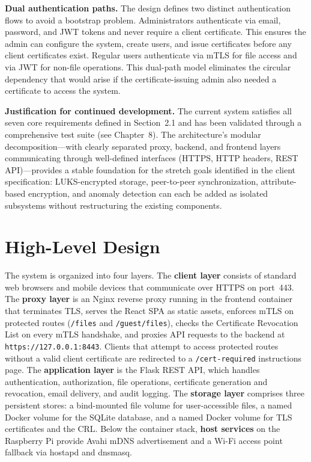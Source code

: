 \documentclass[12pt,letterpaper]{report}
\begin{document}
\textbf{Dual authentication paths.} The design defines two distinct authentication flows to avoid a bootstrap problem. Administrators authenticate via email, password, and JWT tokens and never require a client certificate. This ensures the admin can configure the system, create users, and issue certificates before any client certificates exist. Regular users authenticate via mTLS for file access and via JWT for non-file operations. This dual-path model eliminates the circular dependency that would arise if the certificate-issuing admin also needed a certificate to access the system.

\textbf{Justification for continued development.} The current system satisfies all seven core requirements defined in Section~2.1 and has been validated through a comprehensive test suite (see Chapter~8). The architecture's modular decomposition---with clearly separated proxy, backend, and frontend layers communicating through well-defined interfaces (HTTPS, HTTP headers, REST API)---provides a stable foundation for the stretch goals identified in the client specification: LUKS-encrypted storage, peer-to-peer synchronization, attribute-based encryption, and anomaly detection can each be added as isolated subsystems without restructuring the existing components.

\section{High-Level Design}

The system is organized into four layers. The \textbf{client layer} consists of standard web browsers and mobile devices that communicate over HTTPS on port~443. The \textbf{proxy layer} is an Nginx reverse proxy running in the frontend container that terminates TLS, serves the React SPA as static assets, enforces mTLS on protected routes (\texttt{/files} and \texttt{/guest/files}), checks the Certificate Revocation List on every mTLS handshake, and proxies API requests to the backend at \texttt{https://127.0.0.1:8443}. Clients that attempt to access protected routes without a valid client certificate are redirected to a \texttt{/cert-required} instructions page. The \textbf{application layer} is the Flask REST API, which handles authentication, authorization, file operations, certificate generation and revocation, email delivery, and audit logging. The \textbf{storage layer} comprises three persistent stores: a bind-mounted file volume for user-accessible files, a named Docker volume for the SQLite database, and a named Docker volume for TLS certificates and the CRL. Below the container stack, \textbf{host services} on the Raspberry Pi provide Avahi mDNS advertisement and a Wi-Fi access point fallback via hostapd and dnsmasq.
\end{document}
